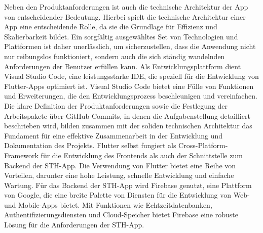 Neben den Produktanforderungen ist auch die technische Architektur der App von entscheidender Bedeutung. Hierbei spielt die technische Architektur einer App eine entscheidende Rolle, da sie die Grundlage für Effizienz und Skalierbarkeit bildet.
Ein sorgfältig ausgewähltes Set von Technologien und Plattformen ist daher unerlässlich, um sicherzustellen, dass die Anwendung nicht nur reibungslos funktioniert, sondern auch die sich ständig wandelnden Anforderungen der Benutzer erfüllen kann.
Als Entwicklungsplattform dient Visual Studio Code, eine leistungsstarke IDE, die speziell für die Entwicklung von Flutter-Apps optimiert ist. Visual Studio Code bietet eine Fülle von Funktionen und Erweiterungen, die den Entwicklungsprozess beschleunigen und vereinfachen.
Die klare Definition der Produktanforderungen sowie die Festlegung der Arbeitspakete über GitHub-Commits, in denen die Aufgabenstellung detailliert beschrieben wird, bilden zusammen mit der soliden technischen Architektur das Fundament für eine effektive Zusammenarbeit in der Entwicklung und Dokumentation des Projekts.
Flutter selbst fungiert als Cross-Platform-Framework für die Entwicklung des Frontends als auch der Schnittstelle zum Backend der STH-App. Die Verwendung von Flutter bietet eine Reihe von Vorteilen, darunter eine hohe Leistung, schnelle Entwicklung und einfache Wartung.
Für das Backend der STH-App wird Firebase genutzt, eine Plattform von Google, die eine breite Palette von Diensten für die Entwicklung von Web- und Mobile-Apps bietet. Mit Funktionen wie Echtzeitdatenbanken, Authentifizierungsdiensten und Cloud-Speicher bietet Firebase eine robuste Lösung für die Anforderungen der STH-App.

